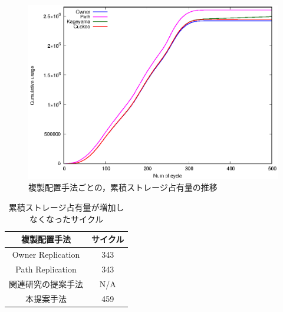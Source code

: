 \documentclass[11pt]{jreport}
\begin{document}
\begin{figure}[H]
	\begin{center}
		\includegraphics[width=15.0cm]{./figure/occupancy_comp.eps}
	\end{center}
	\caption{複製配置手法ごとの，累積ストレージ占有量の推移}
	\label{fig:occupancy_comp}
\end{figure}

\begin{table}[H]
	\begin{center}
	\caption{累積ストレージ占有量が増加しなくなったサイクル}
	\begin{tabular}{ | c | c | } \hline
	複製配置手法  & サイクル \\ \hline \hline
	Owner Replication & 343 \\ \cline{1-2}
	Path Replication & 343 \\ \cline{1-2}
	関連研究の提案手法 & N/A \\ \cline{1-2}
	本提案手法 & 459 \\ \cline{1-2}
	\end{tabular}
	\label{tab:occupancy}
	\end{center}
\end{table}
\end{document}
